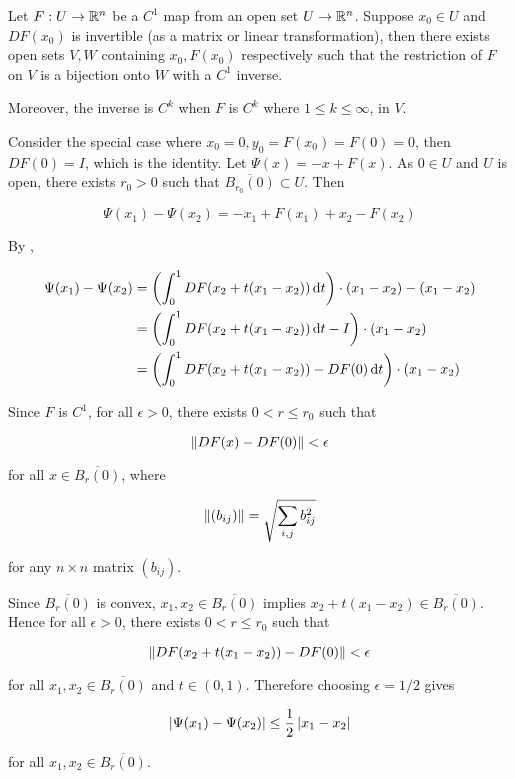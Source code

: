 \documentclass[a4paper,12pt]{article}
\begin{document}
\begin{thm}
  Let $F:U\to\mathbb{R}^{n}$ be a $C^{1}$ map from an open set $U\to\mathbb{R}^{n}$. Suppose $x_{0}\in U$ and $DF(x_{0})$ is invertible (as a matrix or linear transformation), then there exists open sets $V,W$ containing $x_{0},F(x_{0})$ respectively such that the restriction of $F$ on $V$ is a bijection onto $W$ with a $C^{1}$ inverse.\n
  
  Moreover, the inverse is $C^{k}$ when $F$ is $C^{k}$ where $1\leq k\leq\infty$, in $V$.\n

  \prf{} Consider the special case where $x_{0}=0,y_{0}=F(x_{0})=F(0)=0$, then $DF(0)=I$, which is the identity. Let $\Psi(x)=-x+F(x)$. As $0\in U$ and $U$ is open, there exists $r_{0}>0$ such that $\overline{B_{r_{0}}(0)}\subset U$. Then

  $$\Psi(x_{1})-\Psi(x_{2})=-x_{1}+F(x_{1})+x_{2}-F(x_{2})$$\s

  By \rpst[\sctr{3}],

  $$\begin{aligned}[t]
    \Psi(x_{1})-\Psi(x_{2})&=\left( \int_{0}^{1}DF(x_{2}+t(x_{1}-x_{2}))\,\mathrm{d} t\right)\cdot(x_{1}-x_{2})-(x_{1}-x_{2})\\
    &=\left( \int_{0}^{1}DF(x_{2}+t(x_{1}-x_{2}))\,\mathrm{d} t-I\right)\cdot(x_{1}-x_{2})\\
    &=\left( \int_{0}^{1}DF(x_{2}+t(x_{1}-x_{2}))-DF(0)\,\mathrm{d} t\right)\cdot(x_{1}-x_{2})
  \end{aligned}$$\s

  Since $F$ is $C^{1}$, for all $\epsilon>0$, there exists $0<r\leq r_{0}$ such that

  $$\left\| DF(x)-DF(0)\right\|<\epsilon$$\s

  for all $x\in\overline{B_{r}(0)}$, where

  $$\left\| (b_{ij})\right\|=\sqrt{\sum_{i,j}b_{ij}^{2}}$$\s

  for any $n\times n$ matrix $(b_{ij})$.\n
  
  Since $\overline{B_{r}(0)}$ is convex, $x_{1},x_{2}\in\overline{B_{r}(0)}$ implies $x_{2}+t(x_{1}-x_{2})\in\overline{B_{r}(0)}$. Hence for all $\epsilon>0$, there exists $0<r\leq r_{0}$ such that

  $$\left\| DF(x_{2}+t(x_{1}-x_{2}))-DF(0)\right\|<\epsilon$$\s

  for all $x_{1},x_{2}\in\overline{B_{r}(0)}$ and $t\in(0,1)$. Therefore choosing $\epsilon=1/2$ gives

  $$\left| \Psi(x_{1})-\Psi(x_{2})\right|\leq\frac{1}{2}\left| x_{1}-x_{2}\right|$$\s

  for all $x_{1},x_{2}\in\overline{B_{r}(0)}$.\n


\end{thm}
\end{document}
